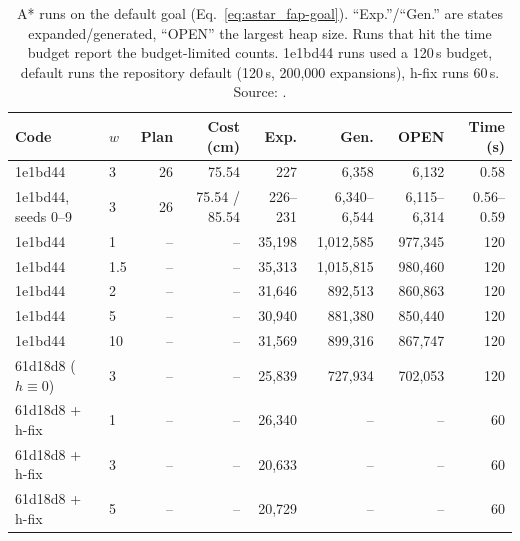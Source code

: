 \begin{table}[htbp]
\centering
\small
\caption{A* runs on the default goal (Eq.~\ref{eq:astar_fap-goal}). ``Exp.''/``Gen.'' are states
expanded/generated, ``OPEN'' the largest heap size. Runs that hit the time budget report the
budget-limited counts. 1e1bd44 runs used a 120\,s budget,  default runs the repository
default (120\,s, 200,000 expansions), h-fix runs 60\,s. Source: .}
\label{tab:astar_fap-runs}
\footnotesize
\setlength{\tabcolsep}{4pt}
\begin{tabular}{@{}llrrrrrr@{}}
\toprule
Code & $w$ & Plan & Cost (cm) & Exp. & Gen. & OPEN & Time (s) \\
\midrule
1e1bd44 & 3 & 26 & 75.54 & 227 & 6,358 & 6,132 & 0.58 \\
1e1bd44, seeds 0--9 & 3 & 26 & 75.54 / 85.54 & 226--231 & 6,340--6,544 & 6,115--6,314 & 0.56--0.59 \\
1e1bd44 & 1 & -- & -- & 35,198 & 1,012,585 & 977,345 & 120 \\
1e1bd44 & 1.5 & -- & -- & 35,313 & 1,015,815 & 980,460 & 120 \\
1e1bd44 & 2 & -- & -- & 31,646 & 892,513 & 860,863 & 120 \\
1e1bd44 & 5 & -- & -- & 30,940 & 881,380 & 850,440 & 120 \\
1e1bd44 & 10 & -- & -- & 31,569 & 899,316 & 867,747 & 120 \\
61d18d8 ($h\equiv0$) & 3 & -- & -- & 25,839 & 727,934 & 702,053 & 120 \\
61d18d8 + h-fix & 1 & -- & -- & 26,340 & -- & -- & 60 \\
61d18d8 + h-fix & 3 & -- & -- & 20,633 & -- & -- & 60 \\
61d18d8 + h-fix & 5 & -- & -- & 20,729 & -- & -- & 60 \\
\bottomrule
\end{tabular}
\end{table}

